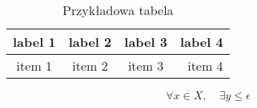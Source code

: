 \begin{table}[h!tb]
  \center
  \caption{Przykładowa tabela}
  \label{my_table}
  \begin{tabular}{ | c | c | c | r | }
    \hline
  label 1 & label 2 & label 3 & label 4 \\
  \hline
  item 1  & item 2  & item 3  & item 4  \\
  \hline
  \end{tabular}
\end{table}

\lipsum[12]

\begin{equation}
 \forall x \in X, \quad \exists y \leq \epsilon
\end{equation}

\lipsum[13]
